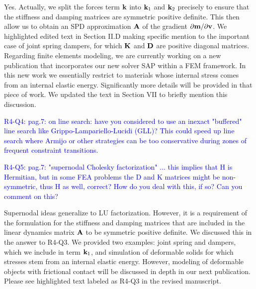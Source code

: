 Yes. Actually, we split the forces term ${\mathbf{k}}$ into ${\mathbf{k}}_1$ and ${\mathbf{k}}_2$
precisely to ensure that the stiffness and damping matrices are symmetric
positive definite. This then allow us to obtain an SPD approximation ${\mathbf{A}}$ of
the gradient $\partial {\mathbf{m}}/\partial {\mathbf{v}}$. We highlighted edited text in
Section II.D making specific mention to the important case of joint spring
dampers, for which ${\mathbf{K}}$ and ${\mathbf{D}}$ are positive diagonal matrices.
Regarding finite elements modeling, we are currently working on a new
publication that incorporates our new solver SAP within a FEM framework. In this
new work we essentially restrict to materials whose internal stress comes from
an internal elastic energy. Significantly more details will be provided in that
piece of work. We updated the text in Section VII to briefly mention this
discussion.

\vspace{5mm}

\textcolor{blue}{R4-Q4: pag.7: on line search: have you considered to use an
inexact "buffered" line search like Grippo-Lampariello-Lucidi (GLL)? This could
speed up line search where Armijo or other strategies can be too conservative
during zones of frequent constraint transitions.}


\vspace{5mm}

\textcolor{blue}{R4-Q5: pag.7: "supernodal Cholesky factorization" ... this
implies that H is Hermitian, but in some FEA problems the D and K matrices might
be non-symmetric, thus H as well, correct? How do you deal with this, if so? Can
you comment on this? }

Supernodal ideas generalize to LU factorization. However, it is a requirement of
the formulation for the stiffness and damping matrices that are included in the
linear dynamics matrix ${\mathbf{A}}$ to be symmetric positive definite. We discussed
this in the answer to R4-Q3. We provided two examples: joint spring and dampers,
which we include in term ${\mathbf{k}}_1$, and simulation of deformable solids for
which stresses stem from an internal elastic energy. However, modeling
of deformable objects with frictional contact will be discussed in depth in our
next publication. Please see highlighted text labeled as R4-Q3 in the revised
manuscript.

